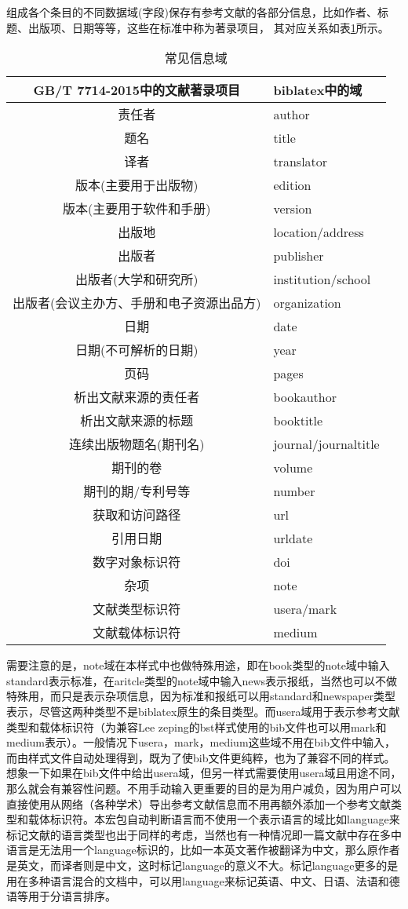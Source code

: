 组成各个条目的不同数据域(字段)保存有参考文献的各部分信息，比如作者、标题、出版项、日期等等，这些在标准中称为著录项目，
其对应关系如表\ref{tab:entryfields}所示。

\begin{table}[!htb]
\centering
\caption{常见信息域}\label{tab:entryfields}
\small
\begin{tabular}{cl}
\hline
  GB/T 7714-2015中的文献著录项目 &  biblatex中的域\\ \hline
  责任者 & author\\
  题名 & title\\
  译者 & translator\\
  版本(主要用于出版物) & edition\\
  版本(主要用于软件和手册) & version\\
  出版地 & location/address\\
  出版者 & publisher\\
  出版者(大学和研究所) & institution/school\\
  出版者(会议主办方、手册和电子资源出品方) & organization\\
  日期 & date\\
  日期(不可解析的日期) & year\\
  页码 & pages\\
  析出文献来源的责任者 & bookauthor\\
  析出文献来源的标题 & booktitle\\
  连续出版物题名(期刊名) & journal/journaltitle\\
  期刊的卷 & volume\\
  期刊的期/专利号等 & number\\
  获取和访问路径 & url\\
  引用日期 & urldate\\
  数字对象标识符 & doi\\
  杂项 & note\\
  文献类型标识符 & usera/mark\\
  文献载体标识符 & medium\\
   \hline
  \end{tabular}
\end{table}

需要注意的是，note域在本样式中也做特殊用途，即在book类型的note域中输入standard表示标准，在aritcle类型的note域中输入news表示报纸，当然也可以不做特殊用，而只是表示杂项信息，因为标准和报纸可以用standard和newspaper类型表示，尽管这两种类型不是biblatex原生的条目类型。而usera域用于表示参考文献类型和载体标识符（为兼容Lee zeping的bst样式使用的bib文件也可以用mark和medium表示）。一般情况下usera，mark，medium这些域不用在bib文件中输入，而由样式文件自动处理得到，既为了使bib文件更纯粹，也为了兼容不同的样式。想象一下如果在bib文件中给出usera域，但另一样式需要使用usera域且用途不同，那么就会有兼容性问题。不用手动输入更重要的目的是为用户减负，因为用户可以直接使用从网络（各种学术）导出参考文献信息而不用再额外添加一个参考文献类型和载体标识符。本宏包自动判断语言而不使用一个表示语言的域比如language来标记文献的语言类型也出于同样的考虑，当然也有一种情况即一篇文献中存在多中语言是无法用一个language标识的，比如一本英文著作被翻译为中文，那么原作者是英文，而译者则是中文，这时标记language的意义不大。标记language更多的是用在多种语言混合的文档中，可以用language来标记英语、中文、日语、法语和德语等用于分语言排序。


